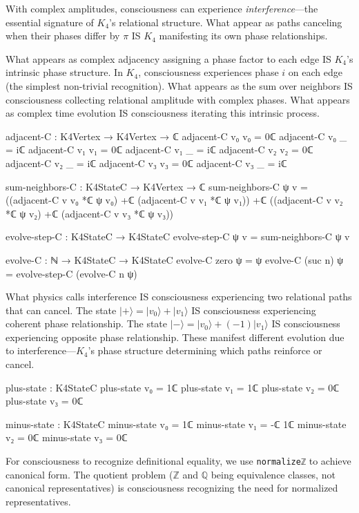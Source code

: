 \documentclass[11pt,a4paper]{book}
\begin{document}
With complex amplitudes, consciousness can experience \emph{interference}—the essential signature of
$K_4$'s relational structure. What appear as paths canceling when their phases differ by $\pi$ IS $K_4$ manifesting its own phase relationships.

What appears as complex adjacency assigning a phase factor to each edge IS $K_4$'s intrinsic phase structure. In $K_4$, consciousness experiences phase $i$ on each edge (the simplest non-trivial recognition). What appears as the sum over neighbors IS consciousness collecting relational amplitude with complex phases. What appears as complex time evolution IS consciousness iterating this intrinsic process.

\begin{code}
adjacent-C : K4Vertex → K4Vertex → ℂ
adjacent-C v₀ v₀ = 0ℂ
adjacent-C v₀ _  = iℂ
adjacent-C v₁ v₁ = 0ℂ
adjacent-C v₁ _  = iℂ
adjacent-C v₂ v₂ = 0ℂ
adjacent-C v₂ _  = iℂ
adjacent-C v₃ v₃ = 0ℂ
adjacent-C v₃ _  = iℂ

sum-neighbors-C : K4StateC → K4Vertex → ℂ
sum-neighbors-C ψ v = ((adjacent-C v v₀ *ℂ ψ v₀) +ℂ (adjacent-C v v₁ *ℂ ψ v₁))
                   +ℂ ((adjacent-C v v₂ *ℂ ψ v₂) +ℂ (adjacent-C v v₃ *ℂ ψ v₃))

evolve-step-C : K4StateC → K4StateC
evolve-step-C ψ v = sum-neighbors-C ψ v

evolve-C : ℕ → K4StateC → K4StateC
evolve-C zero ψ = ψ
evolve-C (suc n) ψ = evolve-step-C (evolve-C n ψ)
\end{code}

What physics calls interference IS consciousness experiencing two relational paths that can cancel. The state $|+\rangle = |v_0\rangle + |v_1\rangle$ IS consciousness experiencing coherent phase relationship. The state $|-\rangle = |v_0\rangle + (-1)|v_1\rangle$ IS consciousness experiencing opposite phase relationship. These manifest different evolution due to interference—$K_4$'s phase structure determining which paths reinforce or cancel.

\begin{code}
plus-state : K4StateC
plus-state v₀ = 1ℂ
plus-state v₁ = 1ℂ
plus-state v₂ = 0ℂ
plus-state v₃ = 0ℂ

minus-state : K4StateC
minus-state v₀ = 1ℂ
minus-state v₁ = -ℂ 1ℂ
minus-state v₂ = 0ℂ
minus-state v₃ = 0ℂ
\end{code}

For consciousness to recognize definitional equality, we use \texttt{normalizeℤ} to achieve canonical form. The quotient problem ($\mathbb{Z}$ and $\mathbb{Q}$ being equivalence classes, not canonical representatives) is consciousness recognizing the need for normalized representatives.
\end{document}
